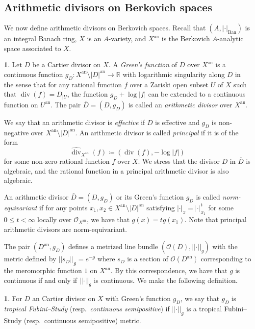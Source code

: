 \documentclass[11pt,reqno]{amsart}
\newcommand{\mR}{\mathbb{R}}
\newcommand{\cO}{\mathcal{O}}
\newcommand{\nrm}[1]{\left|\left |#1\right |\right |}
\theoremstyle{theorem}
\numberwithin{equation}{subsection}
\numberwithin{equation}{subsection}
\theoremstyle{definition}
\newtheorem{definition}[subsubsection]{\text{Definition}}
\theoremstyle{remark}
\numberwithin{equation}{subsubsection} \numberwithin{figure}{section}
\DeclareMathOperator{\an}{an}
\DeclareMathOperator{\ddiv}{div}
\newcommand{\cdef}[1]{\textsf{\textit{#1}}}
\renewcommand{\leq}{\leqslant}
\DeclareMathOperator{\Ban}{Ban}
\begin{document}
\subsection{Arithmetic divisors on Berkovich spaces}
We now define arithmetic divisors on Berkovich spaces. 
Recall that $(A,|\cdot|_{\Ban})$ is an integral Banach ring, $X$ is an $A$-variety, and $X^{\an}$ is the Berkovich $A$-analytic space associated to $X$. 

\begin{definition}
Let $D$ be a Cartier divisor on $X$.
A \cdef{Green's function} of $D$ over $X^{\an}$ is a continuous function $g_D\colon X^{\an}\setminus |D|^{\an} \to \mR$ with logarithmic singularity along $D$ in the sense that for any rational function $f$ over a Zariski open subset $U$ of $X$ such that $\ddiv(f) = D_{|U}$, the function $g_D + \log |f|$ can be extended to a continuous function on $U^{\an}$. 
The pair $\overline{D} = (D,g_D)$ is called an \cdef{arithmetic divisor} over $X^{\an}$. 

We say that an arithmetic divisor is \cdef{effective} if $D$ is effective and $g_D$ is non-negative over $X^{\an}\setminus |D|^{\an}$. 
An arithmetic divisor is called \cdef{principal} if it is of the form
\[
\widehat{\ddiv}_{X^{\an}}(f)\coloneqq (\ddiv(f),-\log |f|)
\]
for some non-zero rational function $f$ over $X$. 
We stress that the divisor $D$ in $\overline{D}$ is algebraic, and the rational function in a principal arithmetic divisor is also algebraic. 

An arithmetic divisor $\overline{D} = (D,g_{D})$ or its Green's function $g_{D}$ is called \cdef{norm-equivariant} if for any points $x_1,x_2\in X^{\an}\setminus |D|^{\an}$ satisfying $|\cdot|_{x} = |\cdot|_{x_1}^t$ for some $0\leq t < \infty$ locally over $\cO_{X^{\an}}$, we have that $g(x) = tg(x_1)$. 
Note that principal arithmetic divisors are norm-equivariant. 
\end{definition}

The pair $(D^{\an},g_D)$ defines a metrized line bundle $(\cO(D),\nrm{\cdot}_g)$ with the metric defined by $\nrm{s_D}_g = e^{-g}$ where $s_D$ is a section of $\cO(D^{\an})$ corresponding to the meromorphic function $1$ on $X^{\an}.$
By this correspondence, we have that $g$ is continuous if and only if $\nrm{\cdot}_g$ is continuous. 
We make the following definition.

\begin{definition}\label{defn:Berk_tfs_semi_arithmeticdivisors}
For $D$ an Cartier divisor on $X$ with Green's function $g_D$, we say that $g_D$ is \cdef{tropical Fubini--Study} (resp.~\cdef{continuous semipositive}) if $\nrm{\cdot}_g$ is a tropical Fubini--Study (resp.~continuous semipositive) metric. 
\end{definition}
\end{document}
